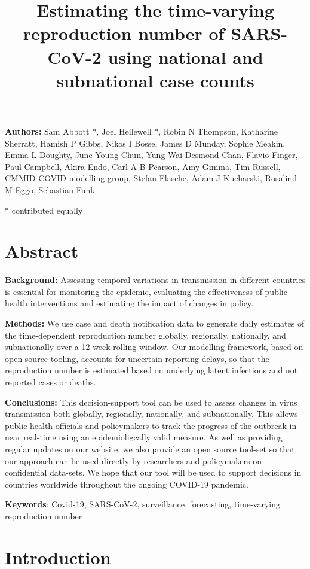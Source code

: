 \documentclass[
]{article}
\title{Estimating the time-varying reproduction number of SARS-CoV-2 using
national and subnational case counts}
\author{}
\date{\vspace{-2.5em}}
\begin{document}
\maketitle

\textbf{Authors:} Sam Abbott *, Joel Hellewell *, Robin N Thompson,
Katharine Sherratt, Hamish P Gibbs, Nikos I Bosse, James D Munday,
Sophie Meakin, Emma L Doughty, June Young Chun, Yung-Wai Desmond Chan,
Flavio Finger, Paul Campbell, Akira Endo, Carl A B Pearson, Amy Gimma,
Tim Russell, CMMID COVID modelling group, Stefan Flasche, Adam J
Kucharski, Rosalind M Eggo, Sebastian Funk

* contributed equally

\hypertarget{abstract}{%
\section{Abstract}\label{abstract}}

\textbf{Background:} Assessing temporal variations in transmission in
different countries is essential for monitoring the epidemic, evaluating
the effectiveness of public health interventions and estimating the
impact of changes in policy.

\textbf{Methods:} We use case and death notification data to generate
daily estimates of the time-dependent reproduction number globally,
regionally, nationally, and subnationally over a 12 week rolling window.
Our modelling framework, based on open source tooling, accounts for
uncertain reporting delays, so that the reproduction number is estimated
based on underlying latent infections and not reported cases or deaths.

\textbf{Conclusions:} This decision-support tool can be used to assess
changes in virus transmission both globally, regionally, nationally, and
subnationally. This allows public health officials and policymakers to
track the progress of the outbreak in near real-time using an
epidemioligcally valid measure. As well as providing regular updates on
our website, we also provide an open source tool-set so that our
approach can be used directly by researchers and policymakers on
confidential data-sets. We hope that our tool will be used to support
decisions in countries worldwide throughout the ongoing COVID-19
pandemic.

\textbf{Keywords}: Covid-19, SARS-CoV-2, surveillance, forecasting,
time-varying reproduction number

\hypertarget{introduction}{%
\section{Introduction}\label{introduction}}
\end{document}
